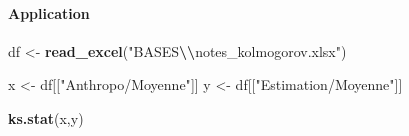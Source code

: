 \documentclass[
  12pt,
]{article}
\newenvironment{Shaded}{\begin{snugshade}}{\end{snugshade}}
\newcommand{\AttributeTok}[1]{\textcolor[rgb]{0.13,0.29,0.53}{#1}}
\newcommand{\CommentTok}[1]{\textcolor[rgb]{0.56,0.35,0.01}{\textit{#1}}}
\newcommand{\FunctionTok}[1]{\textcolor[rgb]{0.13,0.29,0.53}{\textbf{#1}}}
\newcommand{\NormalTok}[1]{#1}
\newcommand{\OtherTok}[1]{\textcolor[rgb]{0.56,0.35,0.01}{#1}}
\newcommand{\SpecialCharTok}[1]{\textcolor[rgb]{0.81,0.36,0.00}{\textbf{#1}}}
\newcommand{\StringTok}[1]{\textcolor[rgb]{0.31,0.60,0.02}{#1}}
\begin{document}
\begin{Shaded}
\end{Shaded}

\paragraph{Application}\label{application-1}

\begin{Shaded}
\begin{Highlighting}[]
\NormalTok{df }\OtherTok{\textless{}{-}} \FunctionTok{read\_excel}\NormalTok{(}\StringTok{"BASES}\SpecialCharTok{\textbackslash{}\textbackslash{}}\StringTok{notes\_kolmogorov.xlsx"}\NormalTok{)}

\NormalTok{x }\OtherTok{\textless{}{-}}\NormalTok{ df[[}\StringTok{"Anthropo/Moyenne"}\NormalTok{]]}
\NormalTok{y }\OtherTok{\textless{}{-}}\NormalTok{ df[[}\StringTok{"Estimation/Moyenne"}\NormalTok{]]}

\FunctionTok{ks.stat}\NormalTok{(x,y)}
\end{Highlighting}
\end{Shaded}
\end{document}
